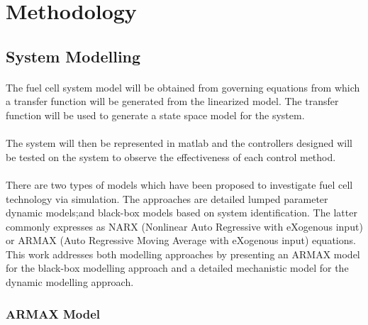 \section{Methodology}
\subsection{System Modelling}
\paragraph{}The fuel cell system model will be obtained from governing equations from which a transfer function will be generated from the linearized model. The transfer function will be used to generate a state space model for the system. 
\paragraph{}The system will then be represented in matlab and the controllers designed will be tested on the system to observe the effectiveness of each control method. 
\paragraph{}There are two types of models which have been proposed to investigate fuel cell technology via simulation.
The approaches are detailed lumped parameter dynamic models;and black-box models based on system identification. The latter commonly expresses as NARX (Nonlinear Auto Regressive with eXogenous input) or ARMAX (Auto Regressive Moving Average with eXogenous input) equations. This work addresses both modelling approaches by presenting an ARMAX model for the black-box modelling approach and a detailed mechanistic model for the dynamic modelling approach.
\subsubsection{ARMAX Model}
